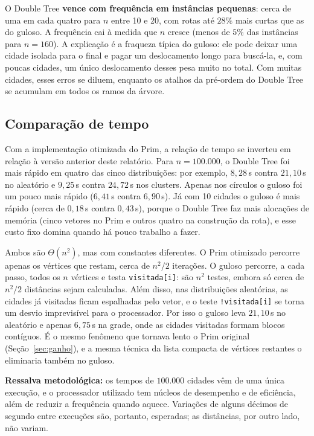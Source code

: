 \documentclass[11pt,a4paper]{article}
\renewcommand{\_}{\underscoreoriginal\allowbreak}
\begin{document}
O Double Tree \textbf{vence com frequência em instâncias pequenas}:
cerca de uma em cada quatro para $n$ entre 10 e 20, com rotas até
$28\%$ mais curtas que as do guloso. A frequência cai à medida que $n$
cresce (menos de $5\%$ das instâncias para $n=160$). A explicação é a
fraqueza típica do guloso: ele pode deixar uma cidade isolada para o
final e pagar um deslocamento longo para buscá-la, e, com poucas
cidades, um único deslocamento desses pesa muito no total. Com muitas
cidades, esses erros se diluem, enquanto os atalhos da pré-ordem do
Double Tree se acumulam em todos os ramos da árvore.

\subsection{Comparação de tempo}

Com a implementação otimizada do Prim, a relação de tempo se inverteu
em relação à versão anterior deste relatório. Para $n=100.000$, o
Double Tree foi mais rápido em quatro das cinco distribuições: por
exemplo, $8{,}28$\,s contra $21{,}10$\,s no aleatório e $9{,}25$\,s
contra $24{,}72$\,s nos clusters. Apenas nos círculos o guloso foi um
pouco mais rápido ($6{,}41$\,s contra $6{,}90$\,s). Já com 10 cidades
o guloso é mais rápido (cerca de $0{,}18$\,\textmu s contra
$0{,}43$\,\textmu s), porque o Double Tree faz mais alocações de
memória (cinco vetores no Prim e outros quatro na construção da rota),
e esse custo fixo domina quando há pouco trabalho a fazer.

Ambos são $\Theta(n^2)$, mas com constantes diferentes. O Prim
otimizado percorre apenas os vértices que restam, cerca de $n^2/2$
iterações. O guloso percorre, a cada passo, todos os $n$ vértices e
testa \texttt{visitada[i]}: são $n^2$ testes, embora só cerca de
$n^2/2$ distâncias sejam calculadas. Além disso, nas distribuições
aleatórias, as cidades já visitadas ficam espalhadas pelo vetor, e o
teste \texttt{!visitada[i]} se torna um desvio imprevisível para o
processador. Por isso o guloso leva $21{,}10$\,s no aleatório e apenas
$6{,}75$\,s na grade, onde as cidades visitadas formam blocos
contíguos. É o mesmo fenômeno que tornava lento o Prim original
(Seção~\ref{sec:ganho}), e a mesma técnica da lista compacta de
vértices restantes o eliminaria também no guloso.

\textbf{Ressalva metodológica:} os tempos de $100.000$ cidades vêm de
uma única execução, e o processador utilizado tem núcleos de desempenho
e de eficiência, além de reduzir a frequência quando aquece. Variações
de alguns décimos de segundo entre execuções são, portanto, esperadas;
as distâncias, por outro lado, não variam.
\end{document}
